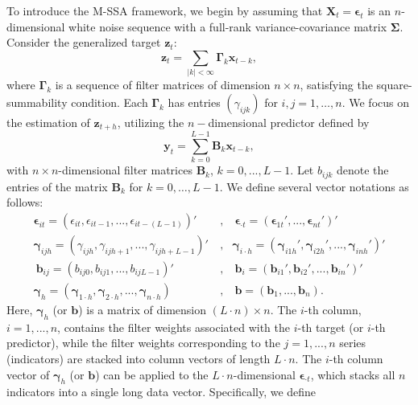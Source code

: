 \documentclass[11pt,a4paper]{article}
\begin{document}
To introduce the M-SSA framework, we begin by assuming that  $\mathbf{X}_t=\boldsymbol{\epsilon}_t$ is an $n$-dimensional white noise sequence with a full-rank variance-covariance matrix $\boldsymbol{\Sigma}$.
Consider the generalized target $\mathbf{z}_t$:
\[
\mathbf{z}_t=\sum_{|k|<\infty}\boldsymbol{\Gamma}_k\mathbf{x}_{t-k},
\] 
where $\boldsymbol{\Gamma}_k$  is a sequence of filter matrices of dimension  $n\times n$, satisfying the square-summability condition. Each $\boldsymbol{\Gamma}_k$ has entries $(\gamma_{ijk})$ for $i, j = 1, \ldots, n$. We focus on the estimation of $\mathbf{z}_{t+h}$, utilizing the $n-$dimensional predictor defined by
\[
\mathbf{y}_t = \sum_{k=0}^{L-1} \mathbf{B}_k \mathbf{x}_{t-k},
\]
with $n\times n$-dimensional filter matrices $\mathbf{B}_k$, $k=0,...,L-1$. Let $b_{ijk}$ denote the entries of the matrix $\mathbf{B}_k$ for $k = 0, \ldots, L-1$. We define several vector notations as follows:
\begin{eqnarray*}
\boldsymbol{\epsilon}_{it}=(\epsilon_{it},\epsilon_{it-1},...,\epsilon_{it-(L-1)})'~&,&~\boldsymbol{\epsilon}_{\cdot t}=(\boldsymbol{\epsilon}_{1t}',...,\boldsymbol{\epsilon}_{nt}')'\\
\boldsymbol{\gamma}_{ijh}=(\gamma_{ijh},\gamma_{ijh+1},...,\gamma_{ijh+L-1})'~&,&\boldsymbol{\gamma}_{i\cdot h}=(\boldsymbol{\gamma}_{i1h}',\boldsymbol{\gamma}_{i2h}',...,\boldsymbol{\gamma}_{inh}')'\\
~\mathbf{b}_{ij}=(b_{ij0},b_{ij1},...,b_{ijL-1})'~&,&~\mathbf{b}_{i}=(\mathbf{b}_{i1}',\mathbf{b}_{i2}',...,\mathbf{b}_{in}')'\\
\boldsymbol{\gamma}_{h}=(\boldsymbol{\gamma}_{1\cdot h},\boldsymbol{\gamma}_{2\cdot h},...,\boldsymbol{\gamma}_{n\cdot h})
~&,&~\mathbf{b}=(\mathbf{b}_1,...,\mathbf{b}_n).%
\end{eqnarray*} 
Here, $\boldsymbol{\gamma}_{h}$ (or $\mathbf{b}$) is a matrix of dimension $(L\cdot n)\times n$. The $i$-th column, $i=1,...,n$, contains the filter weights associated with the $i$-th target (or $i$-th predictor), while the filter weights corresponding to the $j=1,...,n$ series (indicators) are stacked into column vectors of length $L\cdot  n$. The $i$-th column vector of $\boldsymbol{\gamma}_{h}$ (or $\mathbf{b}$) can be applied to the $L\cdot n$-dimensional $\boldsymbol{\epsilon}_{\cdot t}$, which stacks all $n$ indicators into a single long data vector. Specifically, we define 
\end{document}
